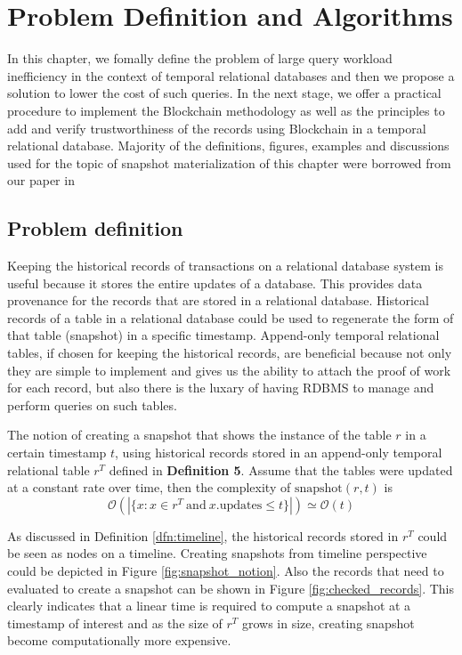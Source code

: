 \chapter{Problem Definition and Algorithms} \label{ch:algorithms}
	In this chapter, we fomally define the problem of large query workload inefficiency in the context of temporal relational databases and then we propose a solution to lower the cost of such queries. In the next stage, we offer a practical procedure to implement the Blockchain methodology as well as the principles to add and verify trustworthiness of the records using Blockchain in a temporal relational database. Majority of the definitions, figures, examples and discussions used for the topic of snapshot materialization of this chapter were borrowed from our paper in \cite{beirami2018snapshot}

	\section{Problem definition} \label{sec:problem_def}
		Keeping the historical records of transactions on a relational database system is useful because it stores the entire updates of a database. This  provides data provenance for the records that are stored in a relational database. Historical records of a table in a relational database could be used to regenerate the form of that table (snapshot) in a specific timestamp. Append-only temporal relational tables, if chosen for keeping the historical records, are beneficial because not only they are simple to implement and gives us the ability to attach the proof of work for each record, but also there is the luxary of having RDBMS to manage and perform queries on such tables.


		\begin{prop}
			The notion of creating a snapshot that shows the instance of the table $r$ in a certain timestamp $t$, using historical records stored in an append-only temporal relational table $r^T$ defined in \textbf{Definition 5}. Assume that the tables were updated at a constant rate over time, then the complexity of $\mathrm{snapshot}(r, t)$ is $$\mathcal{O}(|\{x: x\in r^T\mathrm{\ and\ } x.\mathrm{updates} \leq t\}|)\simeq \mathcal{O}(t)$$ 
		\label{prop:linear_time}
		\end{prop}
			As discussed in Definition \ref{dfn:timeline}, the historical records stored in $r^T$ could be seen as nodes on a timeline. Creating snapshots from timeline perspective could be depicted in Figure \ref{fig:snapshot_notion}.
			Also the records that need to evaluated to create a snapshot can be shown in Figure \ref{fig:checked_records}. This clearly indicates that a linear time is required to compute a snapshot at a timestamp of interest and as the size of $r^T$ grows in size, creating snapshot become computationally more expensive.

